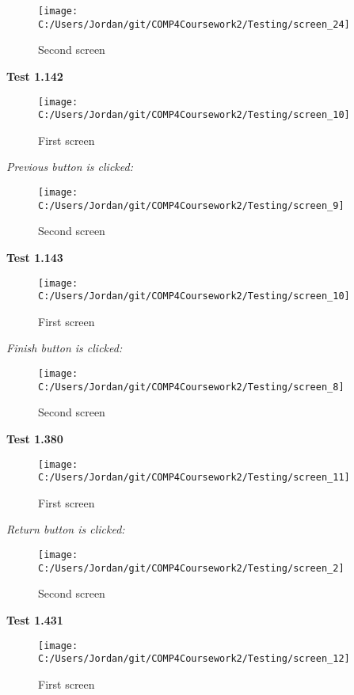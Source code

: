 \begin{figure}[H]
    \label{fig: Second Screen}\caption{Second screen}
    \texttt{[image: C:/Users/Jordan/git/COMP4Coursework2/Testing/screen\_24]}
\end{figure}

\textbf{Test 1.142}

\begin{figure}[H]
    \label{fig: First Screen}\caption{First screen}
    \texttt{[image: C:/Users/Jordan/git/COMP4Coursework2/Testing/screen\_10]}
\end{figure}

\textit{Previous button is clicked: }

\begin{figure}[H]
    \label{fig: Second Screen}\caption{Second screen}
    \texttt{[image: C:/Users/Jordan/git/COMP4Coursework2/Testing/screen\_9]}
\end{figure}

\textbf{Test 1.143}

\begin{figure}[H]
    \label{fig: First Screen}\caption{First screen}
    \texttt{[image: C:/Users/Jordan/git/COMP4Coursework2/Testing/screen\_10]}
\end{figure}

\textit{Finish button is clicked: }

\begin{figure}[H]
    \label{fig: Second Screen}\caption{Second screen}
    \texttt{[image: C:/Users/Jordan/git/COMP4Coursework2/Testing/screen\_8]}
\end{figure}

\textbf{Test 1.380}

\begin{figure}[H]
    \label{fig: First Screen}\caption{First screen}
    \texttt{[image: C:/Users/Jordan/git/COMP4Coursework2/Testing/screen\_11]}
\end{figure}

\textit{Return button is clicked: }

\begin{figure}[H]
    \label{fig: Second Screen}\caption{Second screen}
    \texttt{[image: C:/Users/Jordan/git/COMP4Coursework2/Testing/screen\_2]}
\end{figure}

\textbf{Test 1.431}

\begin{figure}[H]
    \label{fig: First Screen}\caption{First screen}
    \texttt{[image: C:/Users/Jordan/git/COMP4Coursework2/Testing/screen\_12]}
\end{figure}

